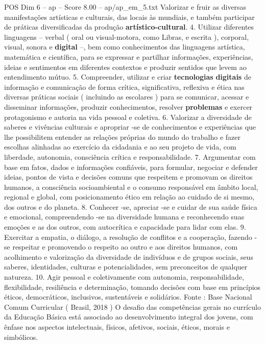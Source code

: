 \begin{textsample}{POS Dim 6 – ap – Score 8.00 – ap/ap\_em\_5.txt}
Valorizar e fruir as diversas manifestações artísticas e culturais, das locais às mundiais, e também participar de práticas diversificadas da produção \textbf{artístico-cultural}. 4.
Utilizar diferentes linguagens – verbal ( oral ou visual-motora, como Libras, e escrita ), corporal, visual, sonora e \textbf{digital} –, bem como conhecimentos das linguagens artística, matemática e científica, para se expressar e partilhar informações, experiências, ideias e sentimentos em diferentes contextos e produzir sentidos que levem ao entendimento mútuo. 5.
Compreender, utilizar e criar \textbf{tecnologias} \textbf{digitais} de informação e comunicação de forma crítica, significativa, reflexiva e ética nas diversas práticas sociais ( incluindo as escolares ) para se comunicar, acessar e disseminar informações, produzir conhecimentos, resolver \textbf{problemas} e exercer protagonismo e autoria na vida pessoal e coletiva. 6.
Valorizar a diversidade de saberes e vivências culturais e apropriar -se de conhecimentos e experiências que lhe possibilitem entender as relações próprias do mundo do trabalho e fazer escolhas alinhadas ao exercício da cidadania e ao seu projeto de vida, com liberdade, autonomia, consciência crítica e responsabilidade. 7.
Argumentar com base em fatos, dados e informações confiáveis, para formular, negociar e defender ideias, pontos de vista e decisões comuns que respeitem e promovam os direitos humanos, a consciência socioambiental e o consumo responsável em âmbito local, regional e global, com posicionamento ético em relação ao cuidado de si mesmo, dos outros e do planeta. 8.
Conhecer -se, apreciar -se e cuidar de sua saúde física e emocional, compreendendo -se na diversidade humana e reconhecendo suas emoções e as dos outros, com autocrítica e capacidade para lidar com elas. 9.
Exercitar a empatia, o diálogo, a resolução de conflitos e a cooperação, fazendo -se respeitar e promovendo o respeito ao outro e aos direitos humanos, com acolhimento e valorização da diversidade de indivíduos e de grupos sociais, seus saberes, identidades, culturas e potencialidades, sem preconceitos de qualquer natureza. 10.
Agir pessoal e coletivamente com autonomia, responsabilidade, flexibilidade, resiliência e determinação, tomando decisões com base em princípios éticos, democráticos, inclusivos, sustentáveis e solidários.
Fonte : Base Nacional Comum Curricular ( Brasil, 2018 ) O desafio das competências gerais no currículo da Educação Básica está associado ao desenvolvimento integral dos jovens, com ênfase nos aspectos intelectuais, físicos, afetivos, sociais, éticos, morais e simbólicos.

\end{textsample}
